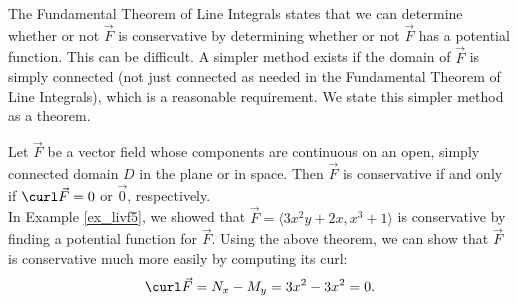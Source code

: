 The Fundamental Theorem of Line Integrals states that we can determine whether or not $\vec F$ is conservative by determining whether or not $\vec F$ has a potential function. This can be difficult. A simpler method exists if the domain of $\vec F$ is simply connected (not just connected as needed in the Fundamental Theorem of Line Integrals), which is a reasonable requirement. We state this simpler method as a theorem.

{Let $\vec F$ be a vector field whose components are continuous on an open, simply connected domain $D$ in the plane or in space. Then $\vec F$ is conservative if and only if $\curl \vec F = 0$ or $\vec 0$, respectively.
}\\

In Example \ref{ex_livf5}, we showed that $\vec F =\langle 3x^2y+2x,x^3+1\rangle$ is conservative by finding a potential function for $\vec F$. Using the above theorem, we can show that $\vec F$ is conservative much more easily by computing its curl:
$$\curl \vec F = N_x - M_y = 3x^2 - 3x^2 = 0.$$

%
